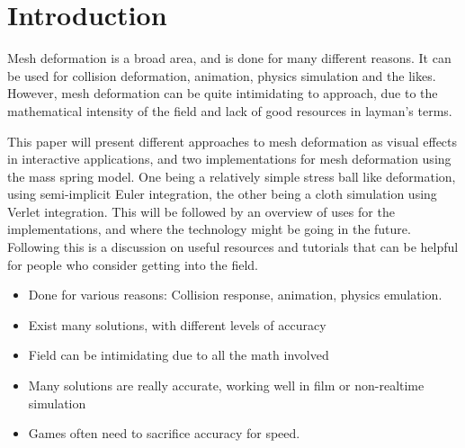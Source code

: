 \chapter{Introduction}
\label{chap:introduction}
Mesh deformation is a broad area, and is done for many different reasons.
It can be used for collision deformation, animation, physics simulation and the likes.
However, mesh deformation can be quite intimidating to approach, due to the mathematical intensity of the field and lack of good resources in layman's terms.

This paper will present different approaches to mesh deformation as visual effects in interactive applications, 
and two implementations for mesh deformation using the mass spring model. 
One being a relatively simple stress ball like deformation, using semi-implicit Euler integration,
the other being a cloth simulation using Verlet integration.
This will be followed by an overview of uses for the implementations, and where the technology might be going in the future.
Following this is a discussion on useful resources and tutorials that can be helpful for people who consider getting into the field.



\think
{
    \begin{itemize}
        \item Done for various reasons: Collision response, animation, physics emulation.
        \item Exist many solutions, with different levels of accuracy
        \item Field can be intimidating due to all the math involved
        \item Many solutions are really accurate, working well in film or non-realtime simulation
        \item Games often need to sacrifice accuracy for speed.
    \end{itemize}
}
